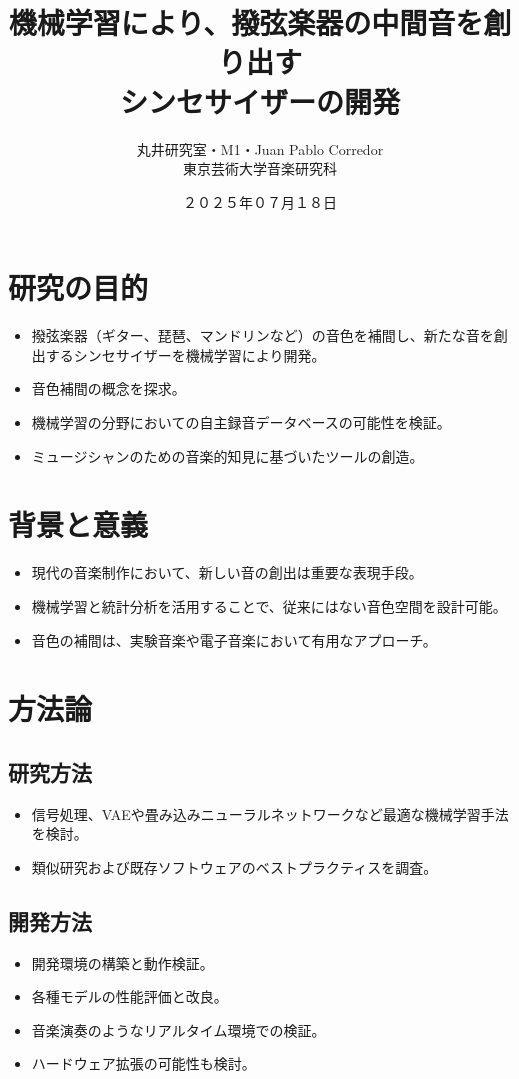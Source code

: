 \documentclass[a4paper, 12pt]{article}
\title{機械学習により、撥弦楽器の中間音を創り出す\\シンセサイザーの開発}
\author{丸井研究室・M1・Juan Pablo Corredor\\東京芸術大学音楽研究科}
\date{２０２５年０７月１８日}
\begin{document}
\maketitle

\section{研究の目的}
\begin{itemize}
  \item 撥弦楽器（ギター、琵琶、マンドリンなど）の音色を補間し、新たな音を創出するシンセサイザーを機械学習により開発。
  \item 音色補間の概念を探求。
  \item 機械学習の分野においての自主録音データベースの可能性を検証。
  \item ミュージシャンのための音楽的知見に基づいたツールの創造。
\end{itemize}

\section{背景と意義}
\begin{itemize}
  \item 現代の音楽制作において、新しい音の創出は重要な表現手段。
  \item 機械学習と統計分析を活用することで、従来にはない音色空間を設計可能。
  \item 音色の補間は、実験音楽や電子音楽において有用なアプローチ。
\end{itemize}

\section{方法論}

\subsection*{研究方法}
\begin{itemize}
  \item 信号処理\cite{DDSP}、VAE\cite{SPINVAE1}や畳み込みニューラルネットワーク\cite{CNNs}など最適な機械学習手法を検討。
  \item 類似研究および既存ソフトウェアのベストプラクティスを調査。
\end{itemize}

\subsection*{開発方法}
\begin{itemize}
  \item 開発環境の構築と動作検証。
  \item 各種モデルの性能評価と改良。
  \item 音楽演奏のようなリアルタイム環境での検証。
  \item ハードウェア拡張の可能性も検討。
\end{itemize}
\end{document}
